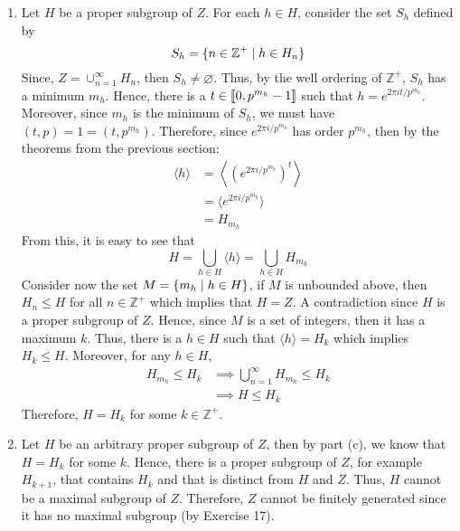 \begin{solution}
\begin{enumerate}[label = \textbf{(\alph*)}]
        \item Let $H$ be a proper subgroup of $Z$. For each $h \in H$, consider the set $S_h$ defined by
        $$S_h = \{n \in \mathbb{Z}^+ \mathrel{|} h \in H_n\}$$
        Since, $Z = \cup_{n=1}^{\infty}H_n$, then $S_h \neq \varnothing$. Thus, by the well ordering of $\mathbb{Z}^+$, $S_h$ has a minimum $m_h$. Hence, there is a $t \in \llbracket 0 , p^{m_h} - 1 \rrbracket$ such that $h = e^{2\pi i t / p^{m_h}}$. Moreover, since $m_h$ is the minimum of $S_h$, we must have $(t,p) = 1 = (t,p^{m_h})$. Therefore, since $e^{2\pi i / p^{m_h}}$ has order $p^{m_h}$, then by the theorems from the previous section:
        \begin{align*}
            \langle h \rangle &= \left< (e^{2\pi i / p^{m_h}})^t \right> \\
            &= \langle e^{2\pi i / p^{m_h}} \rangle \\
            &= H_{m_h}
        \end{align*}
        From this, it is easy to see that
        $$H = \bigcup_{h \in H}\langle h \rangle = \bigcup_{h \in H} H_{m_h}$$
        Consider now the set $M = \{m_h \mathrel{|} h\in H\}$, if $M$ is unbounded above, then $H_n \leq H$ for all $n \in \mathbb{Z}^+$ which implies that $H = Z$. A contradiction since $H$ is a proper subgroup of $Z$. Hence, since $M$ is a set of integers, then it has a maximum $k$. Thus, there is a $h \in H$ such that
        $\langle h \rangle = H_k$ which implies $H_k \leq H$. Moreover, for any $h \in H$, 
        \begin{align*}
            H_{m_h} \leq H_k &\implies \bigcup_{n=1}^{\infty}H_{m_h} \leq H_k \\
            &\implies H \leq H_k
        \end{align*}
        Therefore, $H = H_k$ for some $k \in \mathbb{Z}^+$.

        \item Let $H$ be an arbitrary proper subgroup of $Z$, then by part (c), we know that $H = H_k$ for some $k$. Hence, there is a proper subgroup of $Z$, for example $H_{k+1}$, that contains $H_k$ and that is distinct from $H$ and $Z$. Thus, $H$ cannot be a maximal subgroup of $Z$. Therefore, $Z$ cannot be finitely generated since it has no maximal subgroup (by Exercise 17). \\
    \end{enumerate}
\end{solution}

